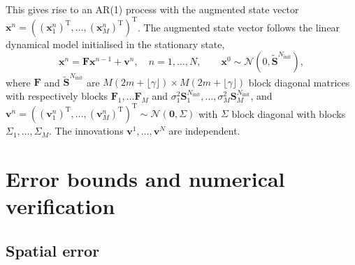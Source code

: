 \documentclass[12pt]{article} %
\begin{document}
This gives rise to an AR(1) process with
the augmented state vector $\boldsymbol{x}^n = \left((\boldsymbol{x}_1^n)^\mathrm{T}, \ldots, (\boldsymbol{x}_M^n)^\mathrm{T}\right)^\mathrm{T}$. The augmented state vector follows 
the linear dynamical model initialised in the stationary state,
\begin{equation} \label{eq:state-space-model}
    \boldsymbol{x}^n = \mathbf{F}\boldsymbol{x}^{n-1}+\boldsymbol{v}^n, \quad n = 1, \ldots, N, \qquad \boldsymbol{x}^0
    \sim \mathcal N(0, \tilde{\mathbf{S}}^{N_\mathrm{\mathrm{init}}}
    ), 
\end{equation}
where 
$\mathbf{F}$ and $\tilde{\mathbf{S}}^{N_\mathrm{\mathrm{init}}}$ are $M(2m+\lfloor\gamma\rfloor)\times M(2m+\lfloor\gamma\rfloor)$ block diagonal matrices with respectively blocks $\mathbf{F}_1,\ldots\mathbf{F}_M$ and $\sigma_1^2\mathbf{S}_1^{N_\mathrm{\mathrm{init}}},\dots,\sigma_M^2\mathbf{S}^{N_\mathrm{\mathrm{init}}}_M$, and $\boldsymbol{v}^n=\left((\boldsymbol{v}_1^n)^\mathrm{T},\ldots,(\boldsymbol{v}_M^n)^\mathrm{T}\right)^\mathrm{T}\sim\mathcal{N}(\boldsymbol{0}, \Sigma)$ with $\Sigma$ block diagonal with blocks $\Sigma_1,\ldots, \Sigma_M$. The innovations $\boldsymbol{v}^1, \ldots, \boldsymbol{v}^N$ are independent. 

\section{Error bounds and numerical verification}\label{sec:ErrorNumVer}
\subsection{Spatial error}\label{sec:theory:spatial}
\end{document}
